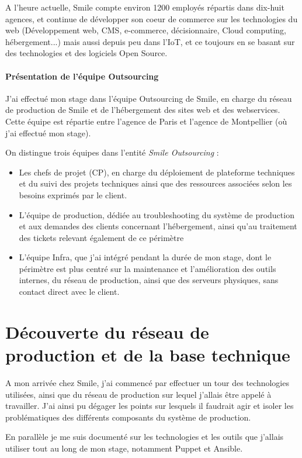 \documentclass[14 pt,a4paper]{extreport}
\begin{document}
A l'heure actuelle, Smile compte environ 1200 employés répartis dans dix-huit agences, et continue de développer son coeur de commerce sur les technologies du web (Développement web, CMS, e-commerce, décisionnaire, Cloud computing, hébergement...) mais aussi depuis peu dans l'IoT, et ce toujours en se basant sur des technologies et des logiciels Open Source.

\subsubsection{Présentation de l'équipe Outsourcing}

J'ai effectué mon stage dans l'équipe Outsourcing de Smile, en charge du réseau de production de Smile et de l'hébergement des sites web et des webservices. Cette équipe est répartie entre l'agence de Paris et l'agence de Montpellier (où j'ai effectué mon stage).

On distingue trois équipes dans l'entité \emph{Smile Outsourcing} :
\begin{itemize}
	\item Les chefs de projet (CP), en charge du déploiement de plateforme techniques et du suivi des projets techniques ainsi que des ressources associées selon les besoins exprimés par le client.
	\item L'équipe de production, dédiée au troubleshooting du système de production et aux demandes des clients concernant l'hébergement, ainsi qu'au traitement des tickets relevant également de ce périmètre
	\item L'équipe Infra, que j'ai intégré pendant la durée de mon stage, dont le périmètre est plus centré sur la maintenance et l'amélioration des outils internes, du réseau de production, ainsi que des serveurs physiques, sans contact direct avec le client.
\end{itemize}

\chapter{Découverte du réseau de production et de la base technique}

A mon arrivée chez Smile, j'ai commencé par effectuer un tour des technologies utilisées, ainsi que du réseau de production sur lequel j'allais être appelé à travailler. J'ai ainsi pu dégager les points sur lesquels il faudrait agir et isoler les problématiques des différents composants du système de production.

En parallèle je me suis documenté sur les technologies et les outils que j'allais utiliser tout au long de mon stage, notamment Puppet et Ansible.
\end{document}
